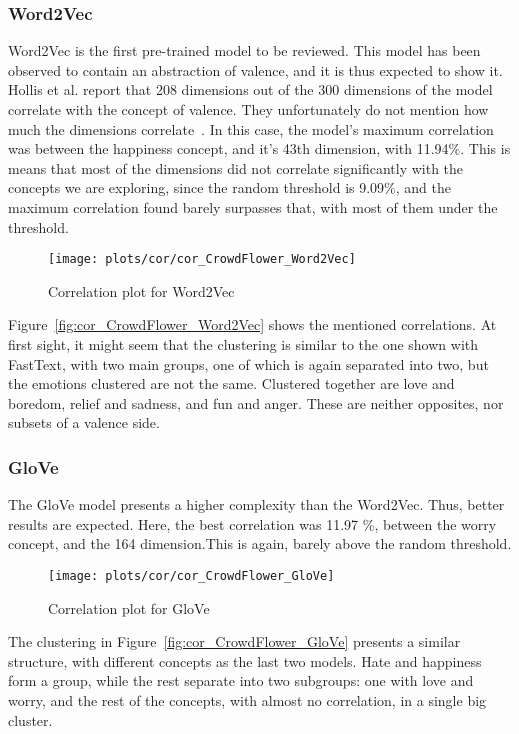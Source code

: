 \subsubsection{Word2Vec}
Word2Vec is the first pre-trained model to be reviewed. This model has been observed to contain an abstraction of valence, and it is thus expected to show it. Hollis et al. report that 208 dimensions out of the 300 dimensions of the model correlate with the concept of valence. They unfortunately do not mention how much the dimensions correlate~\cite{hollis2016principals}. In this case, the model's maximum correlation was between the happiness concept, and it's 43th dimension, with 11.94\%. This is means that most of the dimensions did not correlate significantly with the concepts we are exploring, since the random threshold is 9.09\%, and the maximum correlation found barely surpasses that, with most of them under the threshold.

\begin{figure}[H]
  \texttt{[image: plots/cor/cor\_CrowdFlower\_Word2Vec]}
  \centering
  \caption{Correlation plot for Word2Vec}
\end{figure}\label{fig:cor_CrowdFlower_Word2Vec}

Figure~\ref{fig:cor_CrowdFlower_Word2Vec} shows the mentioned correlations. At first sight, it might seem that the clustering is similar to the one shown with FastText, with two main groups, one of which is again separated into two, but the emotions clustered are not the same. Clustered together are love and boredom, relief and sadness, and fun and anger. These are neither opposites, nor subsets of a valence side.

\subsubsection{GloVe}
The GloVe model presents a higher complexity than the Word2Vec. Thus, better results are expected. Here, the best correlation was 11.97 \%, between the worry concept, and the 164 dimension.This is again, barely above the random threshold.
\begin{figure}[H]
  \texttt{[image: plots/cor/cor\_CrowdFlower\_GloVe]}
  \centering
  \caption{Correlation plot for GloVe}
\end{figure}\label{fig:cor_CrowdFlower_GloVe}
The clustering in Figure~\ref{fig:cor_CrowdFlower_GloVe} presents a similar structure, with different concepts as the last two models. Hate and happiness form a group, while the rest separate into two subgroups: one with love and worry, and the rest of the concepts, with almost no correlation, in a single big cluster.

